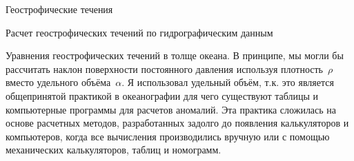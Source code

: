 \begin{chapter}{Геострофические течения}
\begin{section}{Расчет геострофических течений по гидрографическим данным}
\begin{paragraph}{Уравнения геострофических течений в толще океана.}
В принципе, мы могли бы рассчитать наклон поверхности постоянного
давления используя плотность~$\rho$ вместо удельного
объёма~$\alpha$. Я использовал удельный объём, т.к. это является
общепринятой практикой в океанографии для чего существуют таблицы и
компьютерные программы для расчетов аномалий. Эта практика сложилась
на основе расчетных методов, разработанных задолго до появления
калькуляторов и компьютеров, когда все вычисления производились
вручную или с помощью механических калькуляторов, таблиц и номограмм.
%
\end{paragraph}


\end{section}
\end{chapter}
